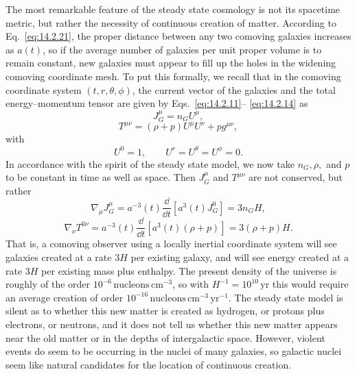 The most remarkable feature of the steady state cosmology is not its
spacetime metric, but rather the necessity of continuous creation of matter.
According to Eq.~\eqref{eq:14.2.21}, the proper distance between any two
comoving galaxies increases as \(a(t)\), so if the average number of
galaxies per unit proper volume is to remain constant, new galaxies must
appear to fill up the holes in the widening comoving coordinate mesh. To put
this formally, we recall that in the comoving coordinate system
\((t,r,\theta,\phi)\), the current vector of the galaxies and the total
energy--momentum tensor are given by Eqs.~\eqref{eq:14.2.11}--%
\eqref{eq:14.2.14} as
\[
  J_G^\mu=n_GU^\mu,
\]
\[
  T^{\mu\nu}
  =
  (\rho+p)U^\mu U^\nu+pg^{\mu\nu},
\]
with
\[
  U^0=1,
  \qquad
  U^r=U^\theta=U^\phi=0.
\]
In accordance with the spirit of the steady state model, we now take
\(n_G,\rho,\) and \(p\) to be constant in time as well as space. Then
\(J_G^\mu\) and \(T^{\mu\nu}\) are not conserved, but rather
\begin{equation}
  \nabla_\mu J_G^\mu
  =
  a^{-3}(t)\frac{\dd}{\dd t}
  \left[
    a^3(t)J_G^0
  \right]
  =
  3n_GH,
  \tag{14.8.7}\label{eq:14.8.7}
\end{equation}
\begin{equation}
  \nabla_\nu T^{0\nu}
  =
  a^{-3}(t)\frac{\dd}{\dd t}
  \left[
    a^3(t)(\rho+p)
  \right]
  =
  3(\rho+p)H.
  \tag{14.8.8}\label{eq:14.8.8}
\end{equation}
That is, a comoving observer using a locally inertial coordinate system will
see galaxies created at a rate \(3H\) per existing galaxy, and will see
energy created at a rate \(3H\) per existing mass plus enthalpy. The present
density of the universe is roughly of the order
\(10^{-6}\,\mathrm{nucleons\,cm^{-3}}\), so with
\(H^{-1}=10^{10}\,\mathrm{yr}\) this would require an average creation of
order \(10^{-16}\,\mathrm{nucleons\,cm^{-3}\,yr^{-1}}\). The steady state
model is silent as to whether this new matter is created as hydrogen, or
protons plus electrons, or neutrons, and it does not tell us whether this
new matter appears near the old matter or in the depths of intergalactic
space. However, violent events do seem to be occurring in the nuclei of many
galaxies, so galactic nuclei seem like natural candidates for the location
of continuous creation.

